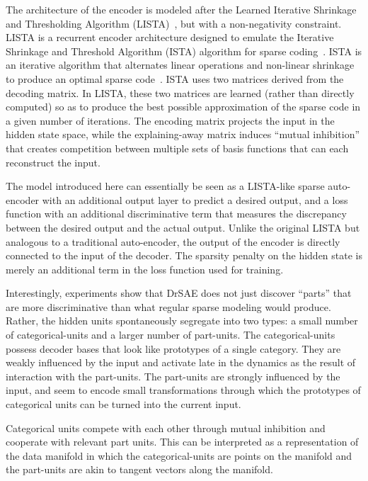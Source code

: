 \documentclass{article} %
\begin{document}
The architecture of the encoder is modeled after the Learned Iterative Shrinkage and Thresholding Algorithm (LISTA)~\citep{gregor2010, sprechmann2012a, sprechmann2012b}, but with a non-negativity constraint. LISTA is a recurrent encoder architecture designed to emulate the Iterative Shrinkage and Threshold Algorithm (ISTA) algorithm for sparse coding~\citep{daubechies2004}. ISTA is an iterative algorithm that alternates linear operations and non-linear shrinkage to produce an optimal sparse code~\citep{olshausen1996, olshausen1997}. ISTA uses two matrices derived from the decoding matrix. In LISTA, these two matrices are learned (rather than directly computed) so as to produce the best possible approximation of the sparse code in a given number of iterations. The encoding matrix projects the input in the hidden state space, while the explaining-away matrix induces ``mutual inhibition'' that creates competition between multiple sets of basis functions that can each reconstruct the input.

The model introduced here can essentially be seen as a LISTA-like sparse auto-encoder with an additional output layer to predict a desired output, and a loss function with an additional discriminative term that measures the discrepancy between the desired output and the actual output.  Unlike the original LISTA but analogous to a traditional auto-encoder, the output of the encoder is directly connected to the input of the decoder. The sparsity penalty on the hidden state is merely an additional term in the loss function used for training.

Interestingly, experiments show that DrSAE does not just discover ``parts'' that are more discriminative than what regular sparse modeling would produce. Rather, the hidden units spontaneously segregate into two types: a small number of categorical-units and a larger number of part-units. The categorical-units possess decoder bases that look like prototypes of a single category. They are weakly influenced by the input and activate late in the dynamics as the result of interaction with the part-units. The part-units are strongly influenced by the input, and seem to encode small transformations through which the prototypes of categorical units can be turned into the current input. 

Categorical units compete with each other through mutual inhibition and cooperate with relevant part units. This can be interpreted as a representation of the data manifold in which the categorical-units are points on the manifold and the part-units are akin to tangent vectors along the manifold.
\end{document}
